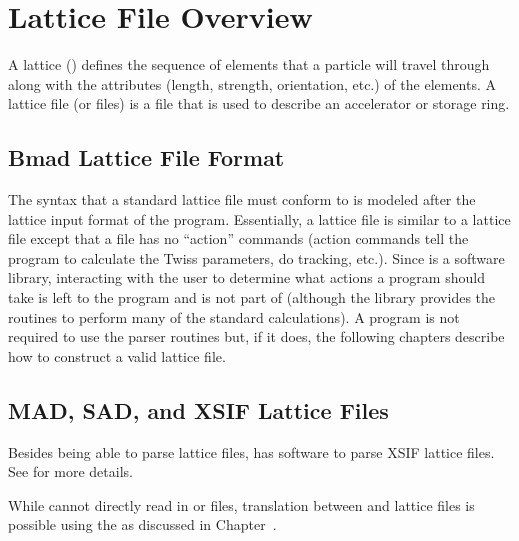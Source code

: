 \chapter{Lattice File Overview}
\label{c:lat.file}

A lattice () defines the sequence of elements
that a particle will travel through along with the attributes (length,
strength, orientation, etc.) of the elements.  A lattice file (or
files) is a file that is used to describe an accelerator or storage
ring. 

\section{Bmad Lattice File Format}
\label{s:lattice.file.formats}

The syntax that a \bmad standard lattice file must conform to is
modeled after the lattice input format of the \mad program.
Essentially, a \bmad lattice file is similar to a \mad lattice file
except that a \bmad file has no ``action'' commands (action commands
tell the program to calculate the Twiss parameters, do tracking,
etc.).  Since \bmad is a software library, interacting with the user
to determine what actions a program should take is left to the program
and is not part of \bmad (although the \bmad library provides the
routines to perform many of the standard calculations). A program is
not required to use the \bmad parser routines but, if it does, the
following chapters describe how to construct a valid lattice file.

\section{MAD, SAD, and XSIF Lattice Files}
\label{s:mad.xsif}

Besides being able to parse \bmad lattice files, \bmad has software to
parse XSIF\cite{b:xsif} lattice files. See  for
more details.

While \bmad cannot directly read in \mad\cite{b:maduser} or
\cite{b:sad} files, translation between \mad and \bmad lattice
files is possible using the  as
discussed in Chapter~.

